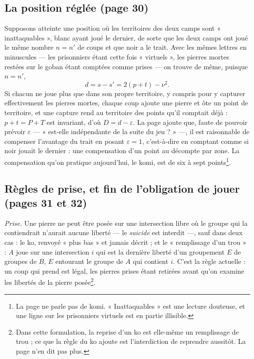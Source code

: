 \documentclass[11pt,a4paper]{article}
\begin{document}
\subsection*{La position réglée (page 30)}

Supposons atteinte une position où les territoires des deux camps sont
« inattaquables », blanc ayant joué le dernier, de sorte que les deux camps
ont joué le même nombre $n = n'$ de coups et que noir a le trait. Avec les
mêmes lettres en minuscules — les prisonniers étant cette fois « virtuels »,
les pierres mortes restées sur le goban étant comptées comme prises — on
trouve de même, puisque $n = n'$,
\[
d = s - s' = 2(p + t) - \nu^{2} .
\]
Si chacun ne joue plus que dans son propre territoire, y compris pour y
capturer effectivement les pierres mortes, chaque coup ajoute une pierre et
ôte un point de territoire, et une capture rend au territoire des points
qu'il comptait déjà : $p + t = P + T$ est invariant, d'où
$D = d - \varepsilon$. La page ajoute que, faute de pouvoir prévoir
$\varepsilon$ — « est-elle indépendante de la suite du jeu ? » —, il est
raisonnable de compenser l'avantage du trait en posant $\varepsilon = 1$,
c'est-à-dire en comptant comme si noir jouait le dernier : une compensation
d'un point au décompte par zone. La compensation qu'on pratique
aujourd'hui, le komi, est de six à sept points\footnote{La page ne parle pas
de komi. « Inattaquables » est une lecture douteuse, et une ligne sur les
prisonniers virtuels est en partie illisible.}.

\subsection*{Règles de prise, et fin de l'obligation de jouer (pages 31 et 32)}

\emph{Prise.} Une pierre ne peut être posée sur une intersection libre où le
groupe qui la contiendrait n'aurait aucune liberté — le \emph{suicide} est
interdit —, sauf dans deux cas : le ko, renvoyé « plus bas » et jamais
décrit ; et le « remplissage d'un trou » : $A$ joue sur une intersection
$i$ qui est la dernière liberté d'un groupement $E$ de groupes de $B$, $E$
entourant le groupe de $A$ qui contient $i$. C'est la règle actuelle : un
coup qui prend est légal, les pierres prises étant retirées avant qu'on
examine les libertés de la pierre posée\footnote{Dans cette formulation, la
reprise d'un ko est elle-même un remplissage de trou ; ce que la règle du ko
ajoute est l'interdiction de reprendre aussitôt. La page n'en dit pas
plus.}.
\end{document}
